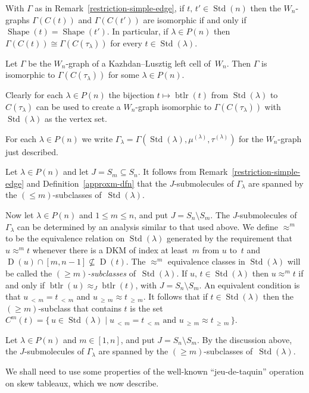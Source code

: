 \documentclass[ALCO,ThmDefs,Unicode,epreuves]{cedram}
\DeclareMathOperator{\word}{btlr}
\newcommand{\lessthan}[2]{#1\,{_{<\,#2}}}
\newcommand{\Morethan}[2]{#1\,{_{\geqslant\,#2}}}
\DeclareMathOperator{\STD}{Std}
\DeclareMathOperator{\shape}{Shape}
\DeclareMathOperator{\D}{D}
\begin{document}
\begin{theo}\label{klthr}
With $\Gamma$ as in Remark~\ref{restriction-simple-edge}, if $t,\,t'\in\STD(n)$
then the $W_n$-graphs $\Gamma(C(t))$ and $\Gamma(C(t'))$
are isomorphic if and only if $\shape(t)=\shape(t')$.
In particular, if $\lambda\in P(n)$ then
$\Gamma(C(t))\cong \Gamma(C(\tau_{\lambda}))$ for every $t\in\STD(\lambda)$.
\end{theo}

\begin{coro}\label{leftcelllambda}
Let $\Gamma$ be the $W_n$-graph of a Kazhdan--Lusztig left cell of~$W_n$. Then
$\Gamma$ is isomorphic to $\Gamma(C(\tau_\lambda))$ for some
$\lambda\in P(n)$.
\end{coro}
Clearly for each $\lambda\in P(n)$ the bijection $t\mapsto\word(t)$
from $\STD(\lambda)$ to $C(\tau_\lambda)$ can be used to create a
$W_n$-graph isomorphic to $\Gamma(C(\tau_\lambda))$ with $\STD(\lambda)$
as the vertex set.

\begin{nota}\label{std-tableau-W-graph}
For each $\lambda\in P(n)$ we write
$\Gamma_\lambda=\Gamma(\STD(\lambda),\mu^{(\lambda)},\tau^{(\lambda)})$ for the
$W_n$-graph just described.
\end{nota}

\begin{rema}\label{Gamma-lambda-submolecules}
Let $\lambda\in P(n)$ and let $J=S_m\subseteq S_n$. It follows from
Remark~\ref{restriction-simple-edge} and Definition~\ref{approxm-dfn}
that the $J$-submolecules of $\Gamma_\lambda$ are spanned by the
$(\leqslant m)$-subclasses of~$\STD(\lambda)$.
\end{rema}
Now let $\lambda\in P(n)$ and $1\leqslant m\leqslant n$, and put
$J=S_n\setminus S_m$. The $J$-submolecules of $\Gamma_\lambda$ can
be determined by an analysis similar to that used above. We define
$\approx^m$ to be the equivalence relation on $\STD(\lambda)$ generated
by the requirement that $u\approx^m t$ whenever there is a DKM
of index at least~$m$ from $u$ to~$t$ and
$\D(u)\cap[m,n-1]\nsubseteq\D(t)$. The $\approx^m$ equivalence
classes in $\STD(\lambda)$ will be called the
\emph{$(\geqslant m)$-subclasses} of~$\STD(\lambda)$.
If $u,\,t\in\STD(\lambda)$ then $u\approx^m t$ if and only if
$\word(u)\approx_J \word(t)$, with $J=S_n\setminus S_m$. An
equivalent condition is that $\lessthan um=\lessthan tm$
and $\Morethan um\approx \Morethan tm$. It follows that if
$t\in\STD(\lambda)$ then the $(\geqslant m)$-subclass that contains
$t$ is the set
$C^m(t) = \{\,u\in\STD(\lambda) \mid\lessthan um = \lessthan tm
\text{ and } \Morethan um\approx \Morethan tm\,\}$.
\begin{rema}\label{Gamma-lambda-submolecules+}
Let $\lambda\in P(n)$ and $m\in[1,n]$, and put $J=S_n\setminus S_m$.
By the discussion above, the $J$-submolecules of $\Gamma_\lambda$ are
spanned by the $(\geqslant m)$-subclasses of~$\STD(\lambda)$.
\end{rema}
We shall need to use some properties of the well-known ``jeu-de-taquin''
operation on skew tableaux, which we now describe.
\end{document}
